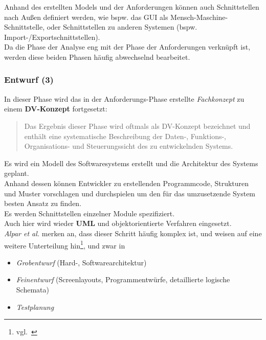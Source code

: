 \noindent
Anhand des erstellten Models und der Anforderungen können auch Schnittstellen nach Außen definiert werden, wie bspw. das GUI als Mensch-Maschine-Schnittstelle, oder Schnittstellen zu anderen Systemen (bspw. Import-/Exportschnittstellen).\\

\noindent
Da die Phase der Analyse eng mit der Phase der Anforderungen verknüpft ist, werden diese beiden Phasen häufig abwechselnd bearbeitet.


\subsubsection{Entwurf (3)}
In dieser Phase wird das in der Anforderungs-Phase erstellte \textit{Fachkonzept} zu einem \textbf{DV-Konzept} fortgesetzt:

\blockquote[{\cite[319]{AABG14n}}]{
    Das Ergebnis dieser Phase wird oftmals als DV-Konzept bezeichnet und enthält eine systematische Beschreibung
    der Daten-, Funktions-, Organisations- und Steuerungssicht des zu entwickelnden Systems.
}

\noindent
Es wird ein Modell des Softwaresystems erstellt und die Architektur des Systems geplant.\\
Anhand dessen können Entwickler zu erstellenden Programmcode, Strukturen und Muster vorschlagen und durchspielen um den für das umzusetzende System besten Ansatz zu finden.\\
Es werden Schnittstellen einzelner Module spezifiziert.\\
Auch hier wird wieder \textbf{UML} und objektorientierte Verfahren eingesetzt.\\

\noindent
\textit{Alpar et al.} merken an, dass dieser Schritt häufig komplex ist, und weisen auf eine weitere Unterteilung hin\footnote{vgl.~\cite[319]{AABG14n}}, und zwar in

\begin{itemize}
    \item \textit{Grobentwurf} (Hard-, Softwarearchitektur)
    \item \textit{Feinentwurf} (Screenlayouts, Programmentwürfe, detaillierte logische Schemata)
    \item \textit{Testplanung}
\end{itemize}


